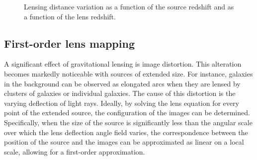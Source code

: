 \begin{figure}
  \centering
  \hfill
  \caption[Lensing distance variation with redshifts]{\protect{} Lensing distance variation as a function of the source redshift and \protect{} as a function of the lens redshift.}
  \label{fig:lensing_distance}
\end{figure}


\subsection{First-order lens mapping}
\label{subsec:first_order_mapping}
A significant effect of gravitational lensing is image distortion. This alteration becomes markedly noticeable with sources of extended size. For instance, galaxies in the background can be observed as elongated arcs when they are lensed by clusters of galaxies or individual galaxies. The cause of this distortion is the varying deflection of light rays. Ideally, by solving the lens equation for every point of the extended source, the configuration of the images can be determined. Specifically, when the size of the source is significantly less than the angular scale over which the lens deflection angle field varies, the correspondence between the position of the source and the images can be approximated as linear on a local scale, allowing for a first-order approximation.

